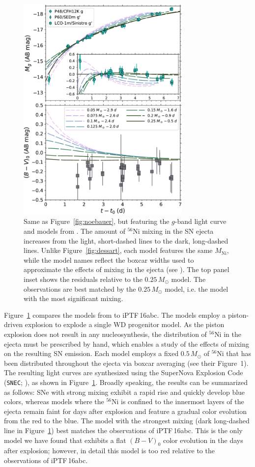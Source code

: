 \documentclass[twocolumn]{aastex61}
\newcommand{\sm}{M_\odot}
\newcommand{\abc}{iPTF\,16abc}
\begin{document}
\begin{figure}[]
  \centering
  \includegraphics[width=3.35in]{compare_Piro.pdf}
  \caption{
  Same as Figure~\ref{fig:noebauer}, but featuring the $g$-band light curve
  and models from \citet{2016ApJ...826...96P}. The amount of $^{56}$Ni
  mixing in the SN ejecta increases from the light, short-dashed lines to
  the dark, long-dashed lines. Unlike Figure~\ref{fig:dessart}, each model
  features the same $M_\mathrm{Ni}$, while the model names reflect the
  boxcar widths used to approximate the effects of mixing in the ejecta (see
  \citealt{2016ApJ...826...96P}). The top panel inset shows the residuals
  relative to the $0.25\,M_\odot$ model. The observations are best matched
  by the $0.25\,M_\odot$ model, i.e. the model with the most significant
  mixing.}
  \label{fig:piro}
\end{figure}

Figure~\ref{fig:piro} compares the models from \citet{2016ApJ...826...96P}
to \abc. The \citeauthor{2016ApJ...826...96P} models employ a piston-driven
explosion to explode a single WD progenitor model. As the piston explosion
does not result in any nucleosynthesis, the distribution of $^{56}$Ni in the
ejecta must be prescribed by hand, which enables a study of the effects of
mixing on the resulting SN emission. Each model employs a fixed $0.5\,\sm$
of $^{56}$Ni that has been distributed throughout the ejecta via boxcar
averaging (see their Figure~1). The resulting light curves are synthesized
using the SuperNova Explosion Code (\texttt{SNEC};
\citealt{2015ApJ...814...63M}), as shown in Figure~\ref{fig:piro}. Broadly
speaking, the results can be summarized as follows: SNe with strong mixing
exhibit a rapid rise and quickly develop blue colors, whereas models where
the $^{56}$Ni is confined to the innermost layers of the ejecta remain faint
for days after explosion and feature a gradual color evolution from the red
to the blue. The model with the strongest mixing (dark long-dashed line in
Figure~\ref{fig:piro}) best matches the observations of \abc. This is the
only model we have found that exhibits a flat $(B-V)_0$ color evolution in
the days after explosion; however, in detail this model is too red relative
to the observations of \abc.
\end{document}
